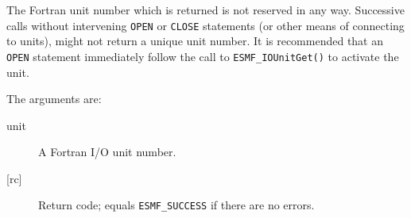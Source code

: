      The Fortran unit number which is returned is not reserved in any way.
     Successive calls without intervening {\tt OPEN} or {\tt CLOSE} statements
     (or other means of connecting to units), might not return a unique unit
     number.  It is recommended that an {\tt OPEN} statement immediately follow
     the call to {\tt ESMF\_IOUnitGet()} to activate the unit.
  
       The arguments are:
       \begin{description}
       \item[unit]
         A Fortran I/O unit number.
       \item[{[rc]}]
         Return code; equals {\tt ESMF\_SUCCESS} if there are no errors.
       \end{description}
\setlength{\parskip}{\oldparskip}
\setlength{\parindent}{\oldparindent}
\setlength{\baselineskip}{\oldbaselineskip}

